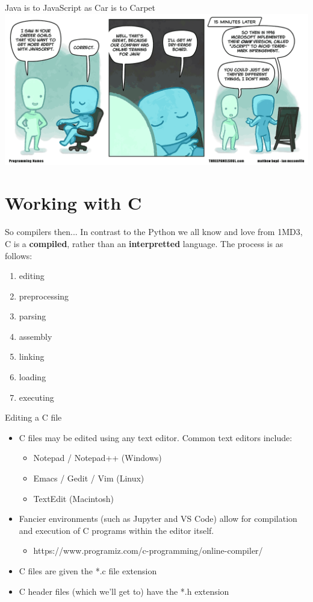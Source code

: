 \documentclass[11pt]{beamer}
\begin{document}
\begin{frame}{Java is to JavaScript as Car is to Carpet}
\center
\includegraphics[scale=0.3]{javascript.png}
\end{frame}

\section[Working with C]{Working with C}
\begin{frame}{So compilers then...}
In contrast to the Python we all know and love from 1MD3, C is a \textbf{compiled}, rather than an \textbf{interpretted} language.  The process is as follows: 
\begin{enumerate}
\item editing
\item preprocessing
\item parsing
\item assembly
\item linking
\item loading 
\item executing
\end{enumerate}
\end{frame}

\begin{frame}{Editing a C file}
\begin{itemize}
\item C files may be edited using any text editor.  Common text editors include:
	\begin{itemize}
	\item Notepad / Notepad++ (Windows)
	\item Emacs / Gedit / Vim (Linux)
	\item TextEdit (Macintosh)
	\end{itemize}
\item Fancier environments (such as Jupyter and VS Code) allow for compilation and execution of C programs within the editor itself.
\begin{itemize}
    \item https://www.programiz.com/c-programming/online-compiler/
\end{itemize}
\item C files are given the *.c file extension
\item C header files (which we'll get to) have the *.h extension 
\end{itemize}
\end{frame}
\end{document}
